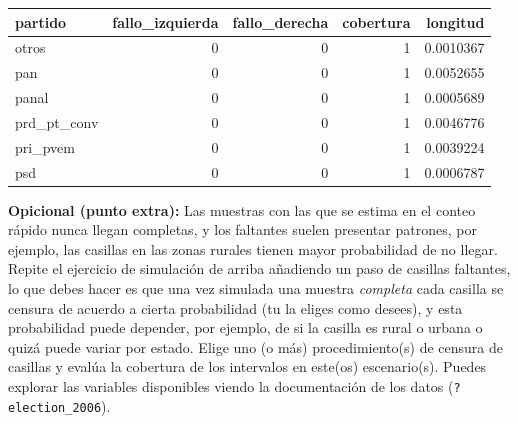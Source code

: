 \documentclass[]{article}
\newenvironment{Shaded}{\begin{snugshade}}{\end{snugshade}}
\newcommand{\DataTypeTok}[1]{\textcolor[rgb]{0.13,0.29,0.53}{#1}}
\newcommand{\DecValTok}[1]{\textcolor[rgb]{0.00,0.00,0.81}{#1}}
\newcommand{\KeywordTok}[1]{\textcolor[rgb]{0.13,0.29,0.53}{\textbf{#1}}}
\newcommand{\NormalTok}[1]{#1}
\newcommand{\OperatorTok}[1]{\textcolor[rgb]{0.81,0.36,0.00}{\textbf{#1}}}
\newcommand{\StringTok}[1]{\textcolor[rgb]{0.31,0.60,0.02}{#1}}
\begin{document}
\begin{Shaded}
\end{Shaded}

\begin{longtable}[]{@{}lrrrr@{}}
\toprule
partido & fallo\_izquierda & fallo\_derecha & cobertura &
longitud\tabularnewline
\midrule
\endhead
otros & 0 & 0 & 1 & 0.0010367\tabularnewline
pan & 0 & 0 & 1 & 0.0052655\tabularnewline
panal & 0 & 0 & 1 & 0.0005689\tabularnewline
prd\_pt\_conv & 0 & 0 & 1 & 0.0046776\tabularnewline
pri\_pvem & 0 & 0 & 1 & 0.0039224\tabularnewline
psd & 0 & 0 & 1 & 0.0006787\tabularnewline
\bottomrule
\end{longtable}

\textbf{Opicional (punto extra):} Las muestras con las que se estima en
el conteo rápido nunca llegan completas, y los faltantes suelen
presentar patrones, por ejemplo, las casillas en las zonas rurales
tienen mayor probabilidad de no llegar. Repite el ejercicio de
simulación de arriba añadiendo un paso de casillas faltantes, lo que
debes hacer es que una vez simulada una muestra \emph{completa} cada
casilla se censura de acuerdo a cierta probabilidad (tu la eliges como
desees), y esta probabilidad puede depender, por ejemplo, de si la
casilla es rural o urbana o quizá puede variar por estado. Elige uno (o
más) procedimiento(s) de censura de casillas y evalúa la cobertura de
los intervalos en este(os) escenario(s). Puedes explorar las variables
disponibles viendo la documentación de los datos
(\texttt{?election\_2006}).
\end{document}
